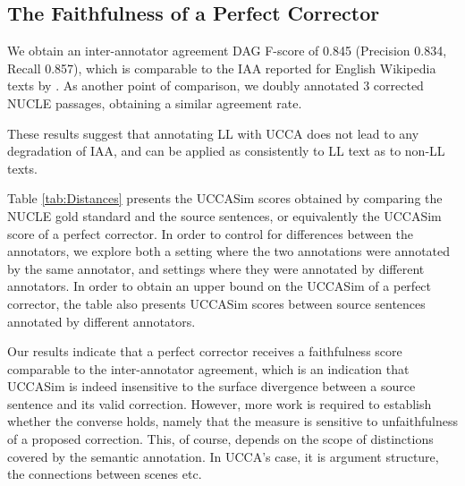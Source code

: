 \documentclass[letter,11pt]{article}
\begin{document}


\subsection{The Faithfulness of a Perfect Corrector}

We obtain an inter-annotator agreement DAG F-score of 0.845
(Precision 0.834, Recall 0.857), which
is comparable to the IAA reported for English Wikipedia texts by \cite{abend2013universal}.
As another point of comparison, we doubly annotated 3 corrected NUCLE passages,
obtaining a similar agreement rate.

These results suggest that annotating LL with UCCA does not lead to any degradation
of IAA, and can be applied as consistently to LL text as to non-LL texts.

Table \ref{tab:Distances} presents the {\sc UCCASim} scores obtained by comparing the 
NUCLE gold standard and the source sentences, or equivalently the {\sc UCCASim} score
of a perfect corrector.
In order to control for differences between the annotators, we explore both
a setting where the two annotations were annotated by the same annotator,
and settings where they were annotated by different annotators.
In order to obtain an upper bound on the {\sc UCCASim} of a perfect corrector,
the table also presents {\sc UCCASim} scores between source sentences annotated by
different annotators.

Our results indicate that a perfect corrector receives a faithfulness score comparable
to the inter-annotator agreement, which is an indication that {\sc UCCASim} is indeed
insensitive to the surface divergence between a source sentence and its valid correction.
However, more work is required to establish whether the converse holds, namely that the measure is sensitive
to unfaithfulness of a proposed correction.
This, of course, depends on the scope of distinctions covered by the semantic annotation.
In UCCA's case, it is argument structure, the connections between scenes etc.
\end{document}
